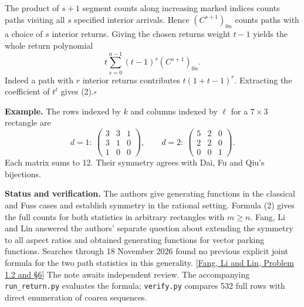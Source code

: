 \documentclass[11pt]{article}
\newcommand{\done}{\hfill\(\square\)}
\begin{document}
The product of $s+1$ segment counts along increasing marked indices counts paths visiting all $s$ specified interior arrivals. Hence $(C^{s+1})_{0n}$ counts paths with a choice of $s$ interior returns. Giving the chosen returns weight $t-1$ yields the whole return polynomial
\[
 t\sum_{s=0}^{n-1}(t-1)^s(C^{s+1})_{0n}.
\]
Indeed a path with $r$ interior returns contributes $t(1+t-1)^r$. Extracting the coefficient of $t^\ell$ gives (2).\done

\textbf{Example.} The rows indexed by $k$ and columns indexed by $\ell$ for a $7\times3$ rectangle are
\[
 d=1:\ \begin{pmatrix}3&3&1\\3&1&0\\1&0&0\end{pmatrix},\qquad
 d=2:\ \begin{pmatrix}5&2&0\\2&2&0\\0&0&1\end{pmatrix}.
\]
Each matrix sums to 12. Their symmetry agrees with Dai, Fu and Qiu's bijections.

\small
\textbf{Status and verification.} The authors give generating functions in the classical and Fuss cases and establish symmetry in the rational setting. Formula (2) gives the full counts for both statistics in arbitrary rectangles with $m\ge n$. Fang, Li and Lin answered the authors' separate question about extending the symmetry to all aspect ratios and obtained generating functions for vector parking functions. Searches through 18 November 2026 found no previous explicit joint formula for the two path statistics in this generality. [\href{https://arxiv.org/abs/2610.05665}{Fang, Li and Lin, Problem 1.2 and \S6}] The note awaits independent review. The accompanying \texttt{run\_return.py} evaluates the formula; \texttt{verify.py} compares 532 full rows with direct enumeration of coarea sequences.
\end{document}
